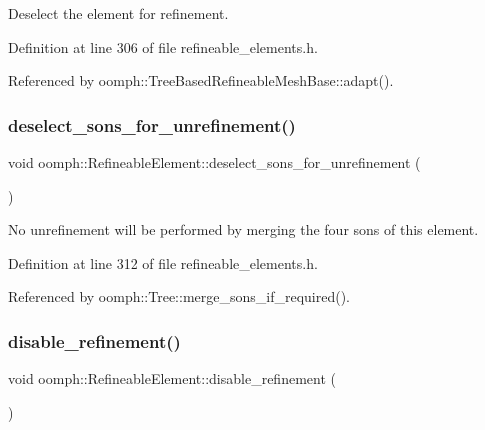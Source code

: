 Deselect the element for refinement. 



Definition at line 306 of file refineable\+\_\+elements.\+h.



Referenced by oomph\+::\+Tree\+Based\+Refineable\+Mesh\+Base\+::adapt().

\mbox{\label{classoomph_1_1RefineableElement_afa0572f14ecd9cc2021f853218d7a659}} 
\subsubsection{\texorpdfstring{deselect\+\_\+sons\+\_\+for\+\_\+unrefinement()}{deselect\_sons\_for\_unrefinement()}}
{\footnotesize\ttfamily void oomph\+::\+Refineable\+Element\+::deselect\+\_\+sons\+\_\+for\+\_\+unrefinement (\begin{DoxyParamCaption}{ }\end{DoxyParamCaption})\hspace{0.3cm}{\ttfamily [inline]}}



No unrefinement will be performed by merging the four sons of this element. 



Definition at line 312 of file refineable\+\_\+elements.\+h.



Referenced by oomph\+::\+Tree\+::merge\+\_\+sons\+\_\+if\+\_\+required().

\mbox{\label{classoomph_1_1RefineableElement_a8625a89189db0116f323a85d3207420b}} 
\subsubsection{\texorpdfstring{disable\+\_\+refinement()}{disable\_refinement()}}
{\footnotesize\ttfamily void oomph\+::\+Refineable\+Element\+::disable\+\_\+refinement (\begin{DoxyParamCaption}{ }\end{DoxyParamCaption})\hspace{0.3cm}{\ttfamily [inline]}}



